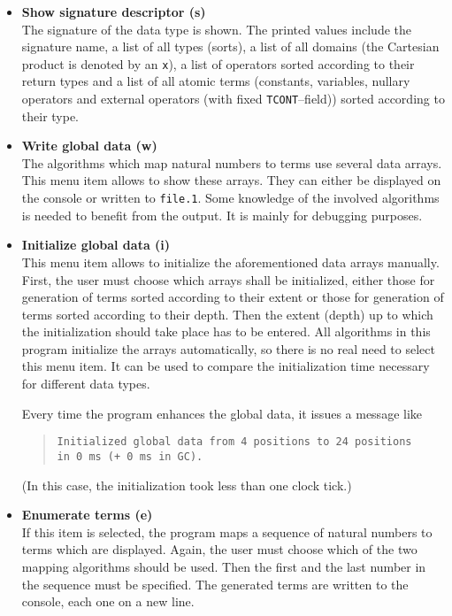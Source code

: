\begin{itemize}
\item{\bf Show signature descriptor (s)}\\
   The signature of the data type is shown. The printed values
   include the signature name, a list of all types (sorts), a list of
   all domains (the Cartesian product is denoted by an {\tt x}), a list
   of operators sorted according to their return types and a list of all
   atomic terms (constants, variables, nullary operators and external
   operators (with fixed {\tt TCONT}--field)) sorted according to their
   type.

\item{\bf Write global data (w)}\\
   The algorithms which map natural numbers to terms use several data
   arrays. This menu item allows to show these arrays. They can either
   be displayed on the console or written to {\tt file.1}. Some
   knowledge of the involved algorithms is needed to benefit from the
   output. It is mainly for debugging purposes.

\item{\bf Initialize global data (i)}\\
   This menu item allows to initialize the aforementioned data arrays
   manually. First, the user must choose which arrays shall be
   initialized, either those for generation of terms sorted according
   to their extent or those for generation of terms sorted according to
   their depth.  Then the extent (depth) up to which the initialization
   should take place has to be entered. All algorithms in this program
   initialize the arrays automatically, so there is no real need to
   select this menu item.  It can be used to compare the initialization
   time necessary for different data types.

Every time the program enhances the global data, it issues a message like
\begin{quote}
\begin{verbatim}
Initialized global data from 4 positions to 24 positions
in 0 ms (+ 0 ms in GC).
\end{verbatim}
\end{quote}
(In this case, the initialization took less than one clock tick.)

\item{\bf Enumerate terms (e)}\\
   If this item is selected, the program maps a sequence of natural
   numbers to terms which are displayed.  Again, the user must choose
   which of the two mapping algorithms should be used.  Then the first
   and the last number in the sequence must be specified.  The
   generated terms are written to the console, each one on a new line.


\end{itemize}
